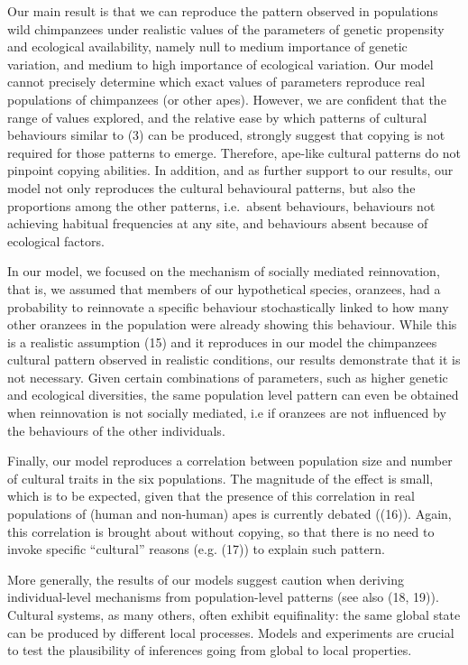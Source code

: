 \documentclass[9pt,twocolumn,twoside,]{pnas-new}
\begin{document}
Our main result is that we can reproduce the pattern observed in
populations wild chimpanzees under realistic values of the parameters of
genetic propensity and ecological availability, namely null to medium
importance of genetic variation, and medium to high importance of
ecological variation. Our model cannot precisely determine which exact
values of parameters reproduce real populations of chimpanzees (or other
apes). However, we are confident that the range of values explored, and
the relative ease by which patterns of cultural behaviours similar to
(3) can be produced, strongly suggest that copying is not required for
those patterns to emerge. Therefore, ape-like cultural patterns do not
pinpoint copying abilities. In addition, and as further support to our
results, our model not only reproduces the cultural behavioural
patterns, but also the proportions among the other patterns, i.e.~absent
behaviours, behaviours not achieving habitual frequencies at any site,
and behaviours absent because of ecological factors.

In our model, we focused on the mechanism of socially mediated
reinnovation, that is, we assumed that members of our hypothetical
species, oranzees, had a probability to reinnovate a specific behaviour
stochastically linked to how many other oranzees in the population were
already showing this behaviour. While this is a realistic assumption
(15) and it reproduces in our model the chimpanzees cultural pattern
observed in realistic conditions, our results demonstrate that it is not
necessary. Given certain combinations of parameters, such as higher
genetic and ecological diversities, the same population level pattern
can even be obtained when reinnovation is not socially mediated, i.e if
oranzees are not influenced by the behaviours of the other individuals.

Finally, our model reproduces a correlation between population size and
number of cultural traits in the six populations. The magnitude of the
effect is small, which is to be expected, given that the presence of
this correlation in real populations of (human and non-human) apes is
currently debated ((16)). Again, this correlation is brought about
without copying, so that there is no need to invoke specific
``cultural'' reasons (e.g. (17)) to explain such pattern.

More generally, the results of our models suggest caution when deriving
individual-level mechanisms from population-level patterns (see also
(18, 19)). Cultural systems, as many others, often exhibit equifinality:
the same global state can be produced by different local processes.
Models and experiments are crucial to test the plausibility of
inferences going from global to local properties.
\end{document}
